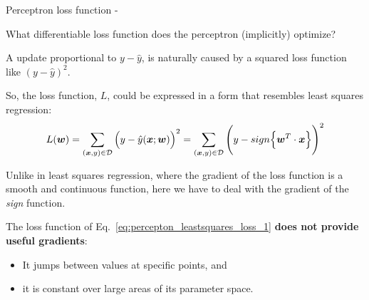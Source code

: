 \begin{frame}[t,allowframebreaks]{Perceptron loss function -}

    What differentiable \gls{loss function} does the 
    \gls{perceptron} (implicitly) optimize?\\
    \vspace{0.3cm}

    A  
    update proportional to $y-\hat{y}$, 
    is naturally caused by a squared loss function like $(y-\hat{y})^2$.\\
    \vspace{0.3cm}

    So, the \gls{loss function}, $L$,
    could be expressed in a form that resembles 
    \gls{least squares} 
    \gls{regression}:\\
    \begin{equation}
        L(\boldsymbol{w}) = 
        \sum_{(\boldsymbol{x},y) \in \mathcal{D}} 
        \Big(y - \hat{y}(\boldsymbol{x};\boldsymbol{w})\Big)^2 =
        \sum_{(\boldsymbol{x},y) \in \mathcal{D}} 
        \Bigg(y - sign\Big\{ \boldsymbol{w}^T \cdot \boldsymbol{x} \Big\}\Bigg)^2
        \label{eq:percepton_leastsquares_loss_1}  
    \end{equation}

    Unlike in \gls{least squares} 
    \gls{regression},
    where the gradient of the \gls{loss function} 
    is a smooth and continuous function, 
    here we have to deal with the gradient of the {\em sign} function. \\

    \framebreak

    \vspace{0.3cm}


    The \gls{loss function} of Eq.~\ref{eq:percepton_leastsquares_loss_1}
    {\bf does not provide useful gradients}:\\ 
    \begin{itemize}
        \item It jumps between values at specific points, and
        \item it is constant over large areas of its parameter space.\\
    \end{itemize}
    \vspace{0.3cm}


\end{frame}

